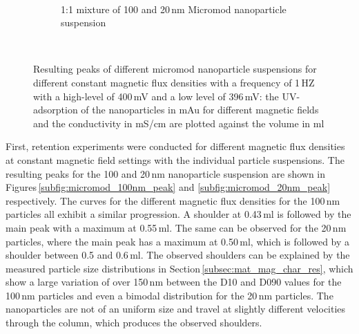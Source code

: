 \begin{figure}
\begin{subfigure}{0.49\textwidth}
        \end{subfigure}
        \\
        	\centering
            \begin{subfigure}{0.49\textwidth}
                  \flushleft
                  \caption{1:1 mixture of 100 and 20\,nm Micromod nanoparticle suspension}\label{subfig:micromod_mix_peak}
          \end{subfigure}\hfill
          \\
        \caption[Resulting peaks of different micromod nanoparticle suspensions for different constant magnetic flux densities]{Resulting peaks of different micromod nanoparticle suspensions for different constant magnetic flux densities with a frequency of 1\,HZ with a high-level of 400\,mV and a low level of 396\,mV: the UV-adsorption of the nanoparticles in mAu for different magnetic fields and the conductivity in mS/cm are plotted against the volume in ml}
        \label{fig:micromod_peaks}
  \end{figure}
\FloatBarrier
First, retention experiments were conducted for different magnetic flux densities at constant magnetic field settings with the individual particle suspensions. The resulting peaks for the 100 and 20\,nm nanoparticle suspension are shown in Figures\,\ref{subfig:micromod_100nm_peak} and \ref{subfig:micromod_20nm_peak} respectively. The curves for the different magnetic flux densities for the 100\,nm particles all exhibit a similar progression. A shoulder at 0.43\,ml is followed by the main peak with a maximum at 0.55\,ml. The same can be observed for the 20\,nm particles, where the main peak has a maximum at 0.50\,ml, which is followed by a shoulder between 0.5 and 0.6\,ml. The observed shoulders can be explained by the measured particle size distributions in Section\,\ref{subsec:mat_mag_char_res}, which show a large variation of over 150\,nm between the D10 and D090 values for the 100\,nm particles and even a bimodal distribution for the 20\,nm particles. The nanoparticles are not of an uniform size and travel at slightly different velocities through the column, which produces the observed shoulders. 
